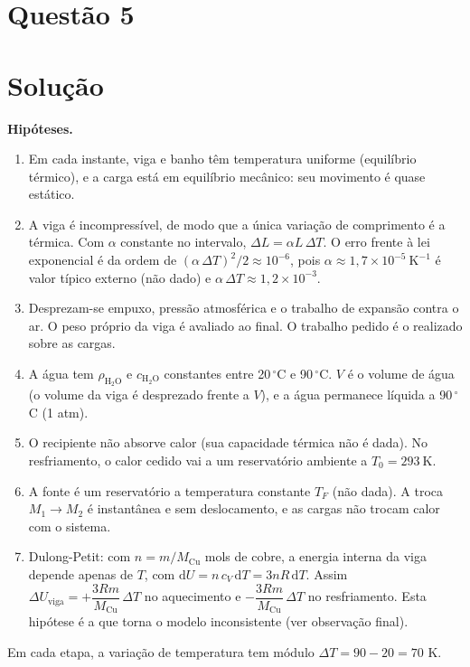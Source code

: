 \documentclass{article}%
\begin{document}
\section*{Questão 5}

\section*{Solução}

\textbf{Hipóteses.}
\begin{enumerate}
\item Em cada instante, viga e banho têm temperatura uniforme (equilíbrio térmico), e a carga está em equilíbrio mecânico: seu movimento é quase estático.
\item A viga é incompressível, de modo que a única variação de comprimento é a térmica. Com $\alpha$ constante no intervalo, $\Delta L=\alpha L\,\Delta T$. O erro frente à lei exponencial é da ordem de $(\alpha\,\Delta T)^2/2\approx 10^{-6}$, pois $\alpha\approx 1{,}7\times 10^{-5}\ \text{K}^{-1}$ é valor típico externo (não dado) e $\alpha\,\Delta T\approx 1{,}2\times 10^{-3}$.
\item Desprezam-se empuxo, pressão atmosférica e o trabalho de expansão contra o ar. O peso próprio da viga é avaliado ao final. O trabalho pedido é o realizado sobre as cargas.
\item A água tem $\rho_{\text{H}_2\text{O}}$ e $c_{\text{H}_2\text{O}}$ constantes entre 20\,$^\circ$C e 90\,$^\circ$C. $V$ é o volume de água (o volume da viga é desprezado frente a $V$), e a água permanece líquida a 90\,$^\circ$C (1 atm).
\item O recipiente não absorve calor (sua capacidade térmica não é dada). No resfriamento, o calor cedido vai a um reservatório ambiente a $T_0=293\ \text{K}$.
\item A fonte é um reservatório a temperatura constante $T_F$ (não dada). A troca $M_1\to M_2$ é instantânea e sem deslocamento, e as cargas não trocam calor com o sistema.
\item Dulong-Petit: com $n=m/M_{\text{Cu}}$ mols de cobre, a energia interna da viga depende apenas de $T$, com $\mathrm{d}U=n\,c_V\,\mathrm{d}T=3nR\,\mathrm{d}T$. Assim $\Delta U_{\text{viga}}=+\dfrac{3Rm}{M_{\text{Cu}}}\,\Delta T$ no aquecimento e $-\dfrac{3Rm}{M_{\text{Cu}}}\,\Delta T$ no resfriamento. Esta hipótese é a que torna o modelo inconsistente (ver observação final).
\end{enumerate}

Em cada etapa, a variação de temperatura tem módulo $\Delta T=90-20=70$ K.
\end{document}
